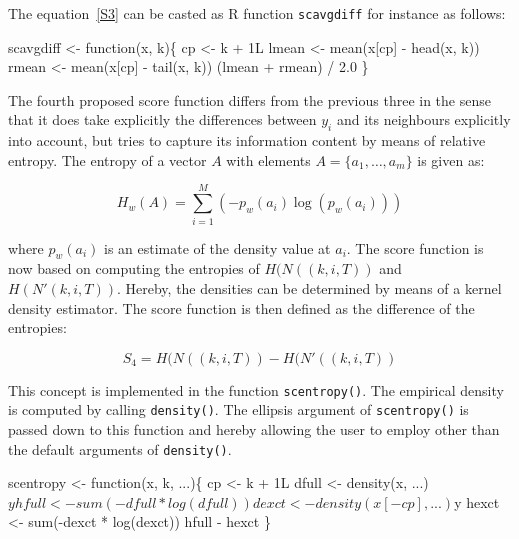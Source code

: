 \documentclass[a4paper]{article}
\begin{document}
The equation~\eqref{S3} can be casted as R function \verb?scavgdiff?
for instance as follows:

\nwenddocs{}\endmoddef
scavgdiff <- function(x, k)\{
    cp <- k + 1L
    lmean <- mean(x[cp] - head(x, k))
    rmean <- mean(x[cp] - tail(x, k))
    (lmean + rmean) / 2.0
\}
\eatline
{}\nwendcode{}%

The fourth proposed score function differs from the previous three in
the sense that it does take explicitly the differences between $y_i$
and its neighbours explicitly into account, but tries to capture its
information content by means of relative entropy. The entropy of a
vector $A$ with elements $A = \{a_1, \ldots, a_m\}$ is given as:

\begin{equation}
H_w(A) = \sum_{i=1}^M \left(-p_w(a_i)\log(p_w(a_i))\right)
\end{equation}

where $p_w(a_i)$ is an estimate of the density value at $a_i$. The
score function is now based on computing the entropies of $H(N((k, i,
T))$ and $H(N'(k, i, T))$. Hereby, the densities can be determined by
means of a kernel density estimator. The score function is then
defined as the difference of the entropies:

\begin{equation}
\label{S4}
S_4 = H(N((k, i, T)) - H(N'((k, i, T))
\end{equation}

This concept is implemented in the function \verb?scentropy()?. The
empirical density is computed by calling \verb?density()?. The ellipsis
argument of \verb?scentropy()? is passed down to this function and hereby
allowing the user to employ other than the default arguments of
\verb?density()?.

\nwenddocs{}\endmoddef
scentropy <- function(x, k, ...)\{
    cp <- k + 1L
    dfull <- density(x, ...)$y
    hfull <- sum(-dfull * log(dfull))
    dexct <- density(x[-cp], ...)$y
    hexct <- sum(-dexct * log(dexct))
    hfull - hexct
\}
\eatline
{}\nwendcode{}%
\end{document}
